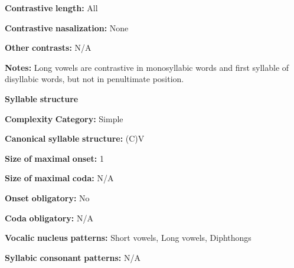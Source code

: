 \begin{styleBody}
\textbf{Contrastive} \textbf{length:} All
\end{styleBody}

\begin{styleBody}
\textbf{Contrastive} \textbf{nasalization:} None
\end{styleBody}

\begin{styleBody}
\textbf{Other} \textbf{contrasts:} N/A
\end{styleBody}

\begin{styleBody}
\textbf{Notes:} Long vowels are contrastive in monosyllabic words and first syllable of disyllabic words, but not in penultimate position.
\end{styleBody}

\begin{styleBody}
\textbf{Syllable} \textbf{structure}
\end{styleBody}

\begin{styleBody}
\textbf{Complexity} \textbf{Category:} Simple
\end{styleBody}

\begin{styleBody}
\textbf{Canonical} \textbf{syllable} \textbf{structure:} (C)V \citep[211-18]{Chen2006}
\end{styleBody}

\begin{styleBody}
\textbf{Size} \textbf{of} \textbf{maximal} \textbf{onset:} 1
\end{styleBody}

\begin{styleBody}
\textbf{Size} \textbf{of} \textbf{maximal} \textbf{coda:} N/A
\end{styleBody}

\begin{styleBody}
\textbf{Onset} \textbf{obligatory:} No
\end{styleBody}

\begin{styleBody}
\textbf{Coda} \textbf{obligatory:} N/A
\end{styleBody}

\begin{styleBody}
\textbf{Vocalic} \textbf{nucleus} \textbf{patterns:} Short vowels, Long vowels, Diphthongs
\end{styleBody}

\begin{styleBody}
\textbf{Syllabic} \textbf{consonant} \textbf{patterns:} N/A
\end{styleBody}


